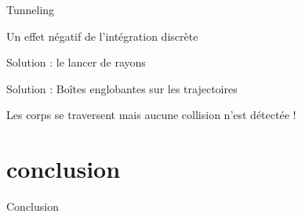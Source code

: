 \documentclass{beamer}
\begin{document}
\begin{frame}{Tunneling}
  \begin{overprint}

    \begin{figure}
      \centering
      
    \end{figure}
    Un effet négatif de l'intégration discrète
    

    \begin{figure}
      \centering
      
    \end{figure}
    Solution : le lancer de rayons

    \begin{figure}
      \centering
      
    \end{figure}
    Solution : Boîtes englobantes sur les trajectoires

  \end{overprint}

  Les corps se traversent mais aucune collision n'est détectée !
\end{frame}

\section{conclusion}

\begin{frame}{Conclusion}
  
\end{frame}
\end{document}
